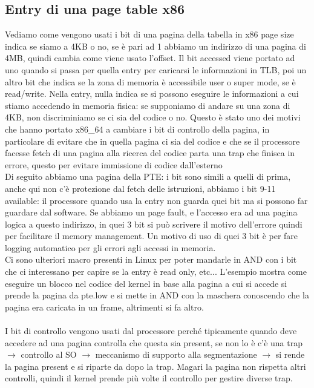 \documentclass[12pt, oneside]{extbook}
\begin{document}
\subsection{Entry di una page table x86}
Vediamo come vengono usati i bit di una pagina della tabella in x86
page size indica se siamo a 4KB o no, se è pari ad 1 abbiamo un indirizzo di una pagina di 4MB, quindi cambia come viene usato l'offset. Il bit accessed viene portato ad uno quando si passa per quella entry per caricarsi le informazioni in TLB, poi un altro bit che indica se la zona di memoria è accessibile user o super mode, se è read/write. Nella entry, nulla indica se si possono eseguire le informazioni a cui stiamo accedendo in memoria fisica: se supponiamo di andare su una zona di 4KB, non discriminiamo se ci sia del codice o no. Questo è stato uno dei motivi che hanno portato x86\_64 a cambiare i bit di controllo della pagina, in particolare di evitare che in quella pagina ci sia del codice e che se il processore facesse fetch di una pagina alla ricerca del codice parta una trap che finisca in errore, questo per evitare immissione di codice dall'esterno\\ Di seguito abbiamo una pagina della PTE:
i bit sono simili a quelli di prima, anche qui non c'è protezione dal fetch delle istruzioni, abbiamo i bit 9-11 available: il processore quando usa la entry non guarda quei bit ma si possono far guardare dal software. Se abbiamo un page fault, e l'accesso era ad una pagina logica a questo indirizzo, in quei 3 bit si può scrivere il motivo dell'errore quindi per facilitare il memory management. Un motivo di uso di quei 3 bit è per fare logging automatico per gli errori agli accessi in memoria.\\ Ci sono ulteriori macro presenti in Linux per poter mandarle in AND con i bit che ci interessano per capire se la entry è read only, etc...
L'esempio mostra come eseguire un blocco nel codice del kernel in base alla pagina a cui si accede
si prende la pagina da pte.low e si mette in AND con la maschera conoscendo che la pagina era caricata in un frame, altrimenti si fa altro.\\\\ I bit di controllo vengono usati dal processore perché tipicamente quando deve accedere ad una pagina controlla che questa sia present, se non lo è c'è una trap $\rightarrow$ controllo al SO $\rightarrow$ meccanismo di supporto alla segmentazione $\rightarrow$ si rende la pagina present e si riparte da dopo la trap. Magari la pagina non rispetta altri controlli, quindi il kernel prende più volte il controllo per gestire diverse trap.\\ 
\end{document}
